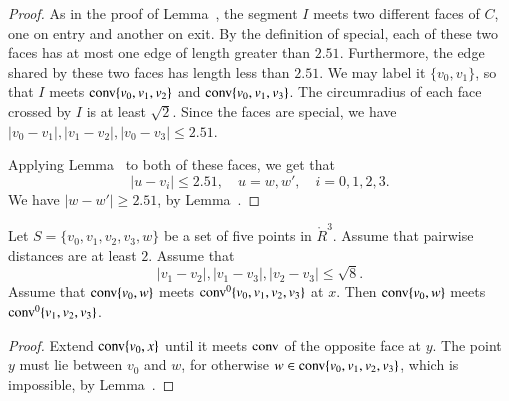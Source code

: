 \begin{proof} As in the proof of Lemma~,
the segment $I$ meets
two different faces of $C$, one on entry and another on exit.
By the definition of special, each of these two faces has at most
one edge of length greater than $2.51$.  Furthermore, the edge
shared by these two faces has length less than $2.51$.  We may
label it $\{v_0,v_1\}$, so that $I$ meets ${\operatorname{conv}}\{v_0,v_1,v_2\}$
and ${\operatorname{conv}}\{v_0,v_1,v_3\}$.   The circumradius
of each face crossed by $I$ is at least $\sqrt2$.
Since the faces are special,
we have $|v_0-v_1|,|v_1-v_2|,|v_0-v_3|\le 2.51$.  

Applying Lemma~
to both of these faces, we get that 
   $$
   |u-v_i|\le 2.51,\quad u=w,w',\quad i=0,1,2,3.
   $$
We have $|w-w'|\ge 2.51$, by Lemma~.\FIXX{$\CalE$}
%
%
\end{proof}

\newpage

\begin{lemma}
Let $S=\{v_0,v_1,v_2,v_3,w\}$ be a set of five points in $\ring{R}^3$.
Assume that pairwise distances are at least $2$.
Assume that 
  $$
  |v_1-v_2|,|v_1-v_3|,|v_2-v_3|\le\sqrt8.
  $$
Assume that ${\operatorname{conv}}\{v_0,w\}$ meets ${\operatorname{conv}}^0\{v_0,v_1,v_2,v_3\}$ at $x$.
Then ${\operatorname{conv}}\{v_0,w\}$ meets ${\operatorname{conv}}^0\{v_1,v_2,v_3\}$.
\end{lemma}

\begin{proof}  Extend ${\operatorname{conv}}\{v_0,x\}$ until it meets
${\operatorname{conv}}$ of the opposite face at $y$.  The point $y$ must lie between
$v_0$ and $w$, for otherwise $w\in{\operatorname{conv}}\{v_0,v_1,v_2,v_3\}$,
which is impossible, by Lemma~.
\end{proof}

